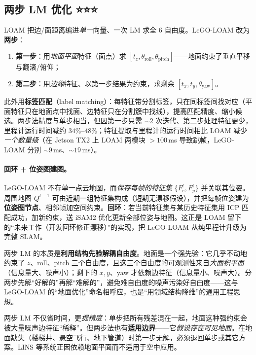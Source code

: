 \subsection{两步 LM 优化 ⭐⭐⭐}
\label{sec:lidar-lego-twostep}

LOAM 把边/面距离编进\emph{单一}向量、一次 LM 求全 $6$ 自由度。LeGO-LOAM 改为\textbf{两步}\cite{shan2018legoloam}：
\begin{enumerate}
  \item \textbf{第一步}：用\emph{地面平面}特征（面点）求 $[t_z,\theta_{\text{roll}},\theta_{\text{pitch}}]$——地面约束了垂直平移与翻滚/俯仰；
  \item \textbf{第二步}：用\emph{边缘}特征、以第一步结果为约束，求剩余 $[t_x,t_y,\theta_{\text{yaw}}]$。
\end{enumerate}
此外用\textbf{标签匹配}（label matching）：每特征带分割标签，只在同标签间找对应（平面特征只在地面点中找面、边特征只在分割簇中找线），提高匹配精度、缩小候选。两步法精度与单步相当，但因第一步只需 $\sim 2$ 次迭代、第二步处理特征更少，里程计运行时间减约 $34\%$–$48\%$；特征提取与里程计的运行时间相比 LOAM 减少\emph{一个数量级}（在 Jetson TX2 上 LOAM 两模块 $>100$\,ms 导致跳帧，LeGO-LOAM 分别 $\sim 9$\,ms、$\sim 19$\,ms）。

\paragraph{回环 + 位姿图建图。}
LeGO-LOAM 不存单一点云地图，而\emph{保存每帧的特征集} $\{F^t_e,F^t_p\}$ 并关联其位姿\cite{shan2018legoloam}。周围地图 $Q^{t-1}$ 可由近期一组特征集构成（短期无漂移假设），并把每帧位姿建为\textbf{位姿图节点}、相邻帧加空间约束。\textbf{回环}：若当前特征集与某历史特征集用 ICP 匹配成功，加新约束，送 iSAM2\cite{kaess2012isam2} 优化更新全部位姿与地图。这正是 LOAM 留下的“未来工作（开发回环修正漂移）”的实现，把 LeGO-LOAM 从纯里程计升级为完整 SLAM。

\begin{insight}
两步 LM 的本质是\textbf{利用结构先验解耦自由度}。地面是一个强先验：它几乎不动地约束了 $z$、roll、pitch 三个自由度，且这三个自由度的可观测性来自\emph{大面积平面}（信息量大、噪声小）；剩下的 $x,y$、yaw 才依赖边特征（信息量小、噪声大）。分两步先解“好解的”再解“难解的”，避免难自由度的噪声污染好自由度——这与 LeGO-LOAM 的“地面优化”命名相呼应，也是“用领域结构降维”的通用工程思想。
\end{insight}

\begin{pitfall}
两步 LM 不仅省时间，更\emph{提精度}：单步把所有残差混在一起，地面这种强约束会被大量噪声边特征“稀释”。但两步法也有\textbf{适用边界}——它\emph{假设存在可见地面}。在地面缺失（楼梯井、悬空飞行、地下管道）时第一步无解，必须退回单步或其它方案。LINS 等系统正因依赖地面平面而不适用于空中应用。
\end{pitfall}

